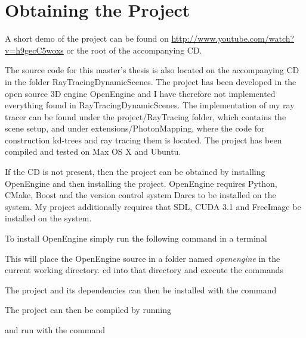 \chapter{Obtaining the Project}

A short demo of the project can be found on
\url{http://www.youtube.com/watch?v=h9gecC5woxs} or the root of the accompanying
CD.

The source code for this master's thesis is also located on the accompanying CD
in the folder RayTracingDynamicScenes. The project has been developed in the
open source 3D engine OpenEngine and I have therefore not implemented everything
found in RayTracingDynamicScenes. The implementation of my ray tracer can be
found under the project/RayTracing folder, which contains the scene setup, and
under extensions/PhotonMapping, where the code for construction kd-trees and ray
tracing them is located. The project has been compiled and tested on Max OS X
and Ubuntu.

If the CD is not present, then the project can be obtained by installing
OpenEngine and then installing the project. OpenEngine requires Python, CMake,
Boost and the version control system Darcs to be installed on the system. My
project additionally requires that SDL, CUDA 3.1 and FreeImage be installed on
the system.

To install OpenEngine simply run the following command in a terminal


This will place the OpenEngine source in a folder named \textit{openengine} in
the current working directory. cd into that directory and execute the commands



The project and its dependencies can then be installed with the command


The project can then be compiled by running 


and run with the command

